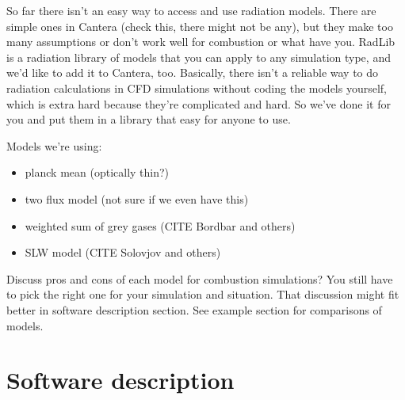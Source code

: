 \documentclass[preprint,12pt, a4paper]{elsarticle}
\begin{document}
So far there isn't an easy way to access and use radiation models. There are simple ones in Cantera (check this, there might not be any), but they make too many assumptions or don't work well for combustion or what have you. RadLib is a radiation library of models that you can apply to any simulation type, and we'd like to add it to Cantera, too. Basically, there isn't a reliable way to do radiation calculations in CFD simulations without coding the models yourself, which is extra hard because they're complicated and hard. So we've done it for you and put them in a library that easy for anyone to use. \cite{Lignell_2018}

Models we're using:
\begin{itemize}
	\item planck mean (optically thin?)
	\item two flux model (not sure if we even have this)
	\item weighted sum of grey gases (CITE Bordbar and others)
	\item SLW model (CITE Solovjov and others)
\end{itemize}
Discuss pros and cons of each model for combustion simulations? You still have to pick the right one for your simulation and situation. That discussion might fit better in software description section. See example section for comparisons of models. 


\section{Software description}
\label{s:description}
\end{document}
